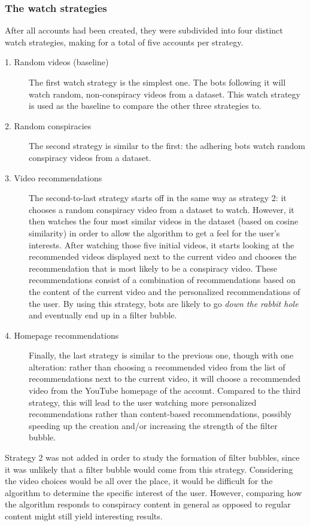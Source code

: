 \documentclass[../main.tex]{subfiles}
\begin{document}
\subsubsection{The watch strategies}
After all accounts had been created, they were subdivided into four distinct watch strategies, making for
a total of five accounts per strategy. 

\begin{description}
\item[1. Random videos (baseline)] The first watch strategy is the simplest one. The bots following 
it will watch random, non-conspiracy videos from a dataset. This watch strategy is used as the 
baseline to compare the other three strategies to.

\item[2. Random conspiracies] The second strategy is similar to the first: the 
adhering bots watch random conspiracy videos from a dataset. 

\item[3. Video recommendations] The second-to-last strategy starts off in the same way as strategy 2: it 
chooses a random conspiracy video from a dataset to watch. However, it then watches the four most similar 
videos in the dataset (based on cosine similarity) in order to allow the algorithm to get a feel for the 
user's interests. After watching those five initial videos, it starts looking at the recommended videos 
displayed next to the current video and chooses the recommendation that is most likely to be a conspiracy 
video. These recommendations consist of a combination of recommendations based on the content of the current
video and the personalized recommendations of the user. By using this strategy, bots are likely to go 
\textit{down the rabbit hole} and eventually end up in a filter bubble.

\item[4. Homepage recommendations] Finally, the last strategy is similar to the previous one, though
with one alteration: rather than choosing a recommended video from the list of recommendations next to the 
current video, it will choose a recommended video from the YouTube homepage of the account. Compared to the 
third strategy, this will lead to the user watching more personalized recommendations rather than 
content-based recommendations, possibly speeding up the creation and/or increasing the strength of the 
filter bubble.

\end{description}
Strategy 2 was not added in order to study the formation of filter bubbles, since it was unlikely that a 
filter bubble would come from this strategy. Considering the video choices would be all over the place, it 
would be difficult for the algorithm to determine the specific interest of the user. However, comparing how 
the algorithm responds to conspiracy content in general as opposed to regular content might still yield 
interesting results.
\end{document}

